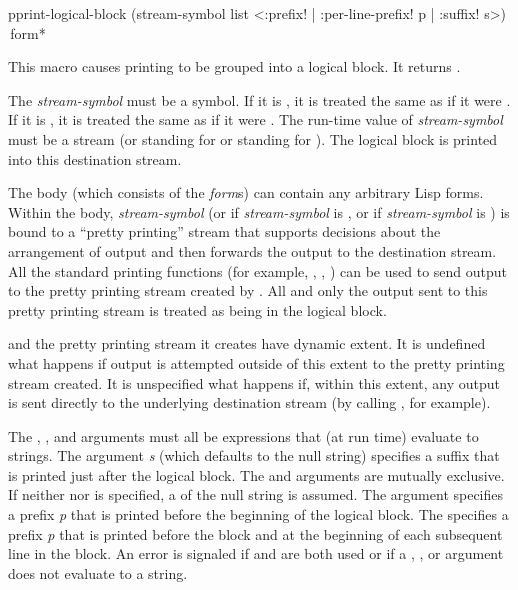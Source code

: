 \begin{defmac}
pprint-logical-block (stream-symbol list
                      <{\!:prefix! | \!:per-line-prefix!} p | \!:suffix! s>)  
                     {\,form}*

This macro causes printing to be grouped into a logical block.  It returns
.

The {\it stream-symbol} must be a symbol.  If it is , it is treated the same
as if it were .  If it is , it is treated the same as if
it were .  The run-time value of {\it stream-symbol} must
be a stream (or  standing for 
or  standing for ).
The logical block is printed into this destination stream.

The body (which consists of the {\it form\/}s)
can contain any arbitrary Lisp forms.  Within the body,
{\it stream-symbol} (or  if {\it stream-symbol} is
, or  if {\it stream-symbol} is ) is bound
to a ``pretty printing'' stream that supports decisions about the arrangement
of output and then forwards the output to the destination stream.  All the
standard printing functions (for example, , , ) can
be used to send output to the pretty printing stream created by
.  All and only the output sent to this pretty
printing stream is treated as being in the logical block.

 and the pretty printing stream it creates have dynamic
extent.  It is undefined what happens if output is attempted outside of
this extent to the pretty printing stream created.  It is unspecified what
happens if, within this extent, any output is sent directly to the
underlying destination stream (by calling , for example).

The , , and  arguments must all
be expressions that (at run time) evaluate to strings.  The  argument {\it s}
(which defaults to the null string) specifies a suffix that is printed just
after the logical block.  The  and  arguments
are mutually exclusive.  If neither  nor  is 
specified, a  of the null string is assumed.
The  argument
specifies a prefix {\it p} that is printed before the beginning of the logical block.
The  specifies a prefix {\it p} that is printed before the block 
and at the beginning of each subsequent line in the block.
An error is signaled if  and  are both used
or if a , , or  argument does not
evaluate to a string.


\end{defmac}
